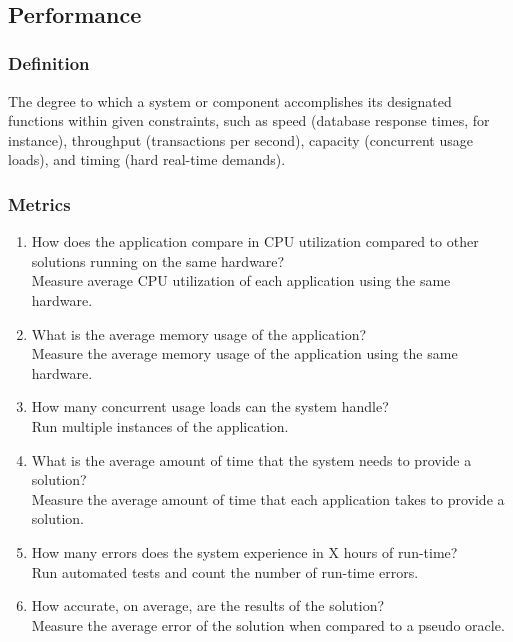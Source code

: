 \documentclass{article}
\begin{document}
~\newpage

\subsection{Performance}
\subsubsection{Definition}
The degree to which a system or component accomplishes its designated functions within given constraints, such as speed (database response times, for instance), throughput (transactions per second), capacity (concurrent usage loads), and timing (hard real-time demands).

\subsubsection{Metrics}

\begin{enumerate}
	\item How does the application compare in CPU utilization compared to other solutions running on the same hardware?\\
	
	Measure average CPU utilization of each application using the same hardware.
	\item What is the average memory usage of the application?\\
	
	Measure the average memory usage of the application using the same hardware.
	\item How many concurrent usage loads can the system handle?\\
	
	Run multiple instances of the application. 
	\item What is the average amount of time that the system needs to provide a solution?\\
	
	Measure the average amount of time that each application takes to provide a solution.
	\item How many errors does the system experience in X hours of run-time?\\
	
	Run automated tests and count the number of run-time errors.
	\item How accurate, on average, are the results of the solution?\\
	
	Measure the average error of the solution when compared to a pseudo oracle.
\end{enumerate}
\end{document}
